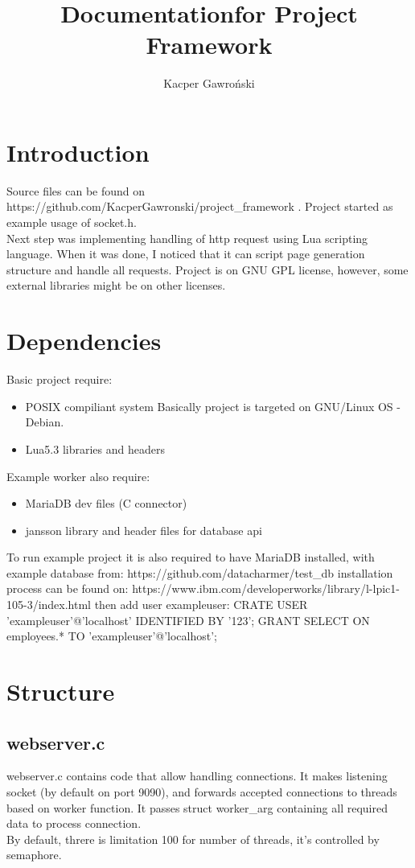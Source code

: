 \documentclass[a4paper]{article}
\title{Documentation\newline for Project Framework}
\author{Kacper Gawroński}
\begin{document}
\maketitle
\section{Introduction}
Source files can be found on https://github.com/KacperGawronski/project\_framework .\newline
Project started as example usage of socket.h.\\
Next step was implementing handling of http request using Lua scripting
language. When it was done, I noticed that it can script page generation
structure and handle all requests. Project is on GNU GPL license, 
however, some external libraries might be on other licenses.
\section{Dependencies}
Basic project require:\\
\begin{itemize}
\item{POSIX compiliant system} Basically project is targeted on GNU/Linux
OS - Debian.
\item{Lua5.3 libraries and headers}
\end{itemize}
Example worker also require:
\begin{itemize}
\item{MariaDB dev files (C connector)}
\item{jansson library and header files} for database api
\end{itemize}
To run example project it is also required to have MariaDB installed,
with example database from:\newline
https://github.com/datacharmer/test\_db\newline
installation process can be found on:\newline
https://www.ibm.com/developerworks/library/l-lpic1-105-3/index.html\newline
then add user exampleuser:\newline
CRATE USER 'exampleuser'@'localhost' IDENTIFIED BY '123';\newline
GRANT SELECT ON employees.* TO 'exampleuser'@'localhost';
\newpage
\section{Structure}
\subsection{webserver.c}
webserver.c contains code that allow handling connections.
It makes listening socket (by default on port 9090), and forwards
accepted connections to threads based on worker function. It passes
struct worker\_arg containing all
required data to process connection.\\
By default, threre is limitation 100 for number of threads, it's
controlled by semaphore.
\end{document}
